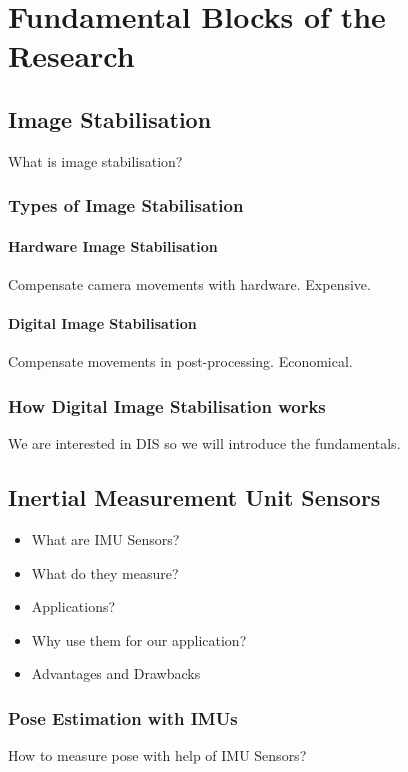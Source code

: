 \chapter{Fundamental Blocks of the Research} \label{chapter_two}


\section{Image Stabilisation}
What is image stabilisation?

\subsection{Types of Image Stabilisation}
\subsubsection{Hardware Image Stabilisation}
Compensate camera movements with hardware. Expensive.

\subsubsection{Digital Image Stabilisation}
Compensate movements in post-processing. Economical.

\subsection{How Digital Image Stabilisation works}
We are interested in DIS so we will introduce the fundamentals.

\section{Inertial Measurement Unit Sensors}
\begin{itemize}
\item What are IMU Sensors?
\item What do they measure?
\item Applications?
\item Why use them for our application?
\item Advantages and Drawbacks
\end{itemize}

\subsection{Pose Estimation with IMUs}
How to measure pose with help of IMU Sensors?

